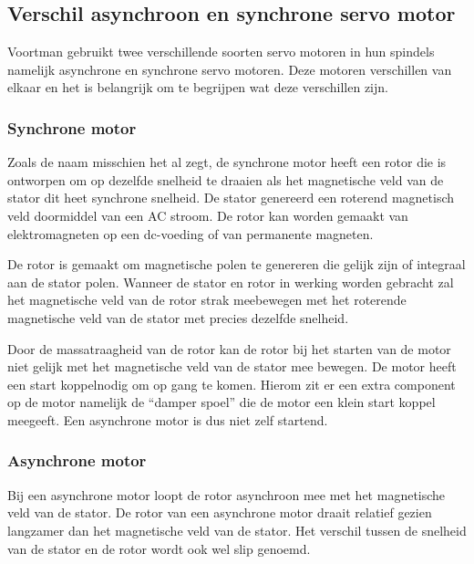 \subsection{Verschil asynchroon en synchrone servo motor}

Voortman gebruikt twee verschillende soorten servo motoren in hun spindels namelijk asynchrone en synchrone servo motoren. Deze motoren verschillen van elkaar en het is belangrijk om te begrijpen wat deze verschillen zijn.

\subsubsection{Synchrone motor}

Zoals de naam misschien het al zegt, de synchrone motor heeft een rotor die is ontworpen om op dezelfde snelheid te draaien als het magnetische veld van de stator dit heet synchrone snelheid. De stator genereerd een roterend magnetisch veld doormiddel van een AC stroom. De rotor kan worden gemaakt van elektromagneten op een dc-voeding of van permanente magneten.

\vspace{0.5cm}

De rotor is gemaakt om magnetische polen te genereren die gelijk zijn of integraal aan de stator polen. Wanneer de stator en rotor in werking worden gebracht zal het magnetische veld van de rotor strak meebewegen met het roterende magnetische veld van de stator met precies dezelfde snelheid.

\vspace{0.5cm}

Door de massatraagheid van de rotor kan de rotor bij het starten van de motor niet gelijk met het magnetische veld van de stator mee bewegen. De motor heeft een start koppelnodig om op gang te komen. Hierom zit er een extra component op de motor namelijk de “damper spoel” die de motor een klein start koppel meegeeft. Een asynchrone motor is dus niet zelf startend. \cite{web:DiffAsyncSync,web:SyncMotor,web:AsyncMotor}


\subsubsection{Asynchrone motor}

Bij een asynchrone motor loopt de rotor asynchroon mee met het magnetische veld van de stator. De rotor van een asynchrone motor draait relatief gezien langzamer dan het magnetische veld van de stator. Het verschil tussen de snelheid van de stator en de rotor wordt ook wel slip genoemd.


